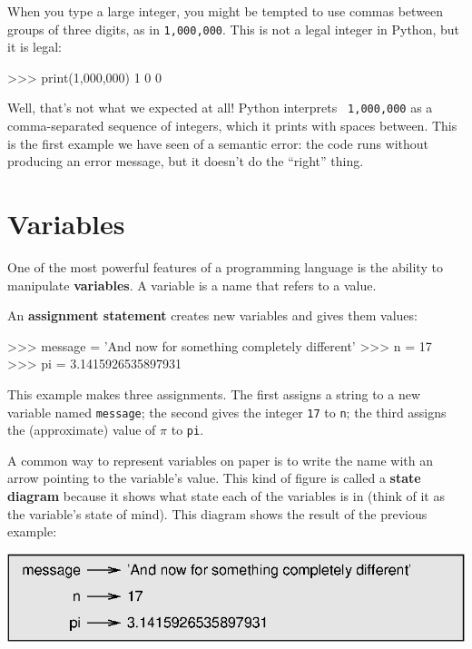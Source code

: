 When you type a large integer, you might be tempted to use commas
between groups of three digits, as in {\tt 1,000,000}.  This is not a
legal integer in Python, but it is legal:

\beforeverb
\begin{pyinterpreter}
>>> print(1,000,000)
1 0 0
\end{pyinterpreter}
\afterverb
%
Well, that's not what we expected at all!  Python interprets {\tt
  1,000,000} as a comma-separated sequence of integers, which it
prints with spaces between.
%
%
This is the first example we have seen of a semantic error: the code
runs without producing an error message, but it doesn't do the
``right'' thing.


\section{Variables}

One of the most powerful features of a programming language is the
ability to manipulate {\bf variables}.  A variable is a name that
refers to a value.

An {\bf assignment statement} creates new variables and gives
them values:

\beforeverb
\begin{pyinterpreter}
>>> message = 'And now for something completely different'
>>> n = 17
>>> pi = 3.1415926535897931
\end{pyinterpreter}
\afterverb
%
This example makes three assignments.  The first assigns a string
to a new variable named {\tt message};
the second gives the integer {\tt 17} to {\tt n}; the third
assigns the (approximate) value of $\pi$ to {\tt pi}.


A common way to represent variables on paper is to write the name with
an arrow pointing to the variable's value.  This kind of figure is
called a {\bf state diagram} because it shows what state each of the
variables is in (think of it as the variable's state of mind).
This diagram shows the result of the previous example:

\beforefig
\centerline{\includegraphics{figs/state2.eps}}
\afterfig

